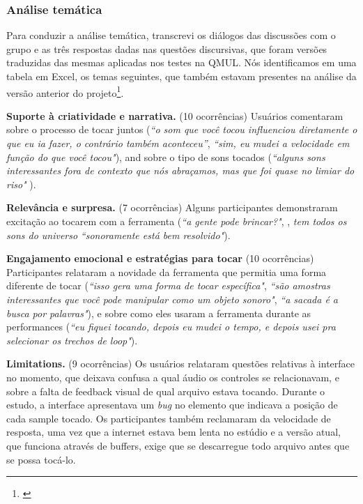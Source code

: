 \subsubsection{Análise temática}
Para conduzir a análise temática\cite{Braun2006}, transcrevi os diálogos das discussões com o grupo e as três respostas dadas nas questões discursivas, que foram versões traduzidas das mesmas aplicadas nos testes na QMUL. Nós identificamos em uma tabela em Excel, os temas seguintes, que também estavam presentes na análise da versão anterior do projeto\footnote{\cite{Stolfi2018b}}.


\textbf{Suporte à criatividade e narrativa.} (10 ocorrências) Usuários comentaram sobre o processo de tocar juntos (\textit{``o som que você tocou influenciou diretamente o que eu ia fazer, o contrário também aconteceu''}, \textit{``sim, eu mudei a velocidade em função do que você tocou"}), and sobre o tipo de sons tocados (\textit{``alguns sons interessantes fora de contexto que nós abraçamos, mas que foi quase no limiar do riso"} ). 

\textbf{Relevância e surpresa.} (7 ocorrências) Alguns participantes demonstraram excitação ao tocarem com a ferramenta (\textit{``a gente pode brincar?"}, , \textit{tem todos os sons do universo} \textit{``sonoramente está bem resolvido"}).

\textbf{Engajamento emocional e estratégias para tocar} (10 ocorrências) Participantes relataram a novidade da ferramenta que permitia uma forma diferente de tocar (\textit{``isso gera uma forma de tocar específica"}, \textit{``são amostras interessantes que você pode manipular como um objeto sonoro"}, \textit{``a sacada é a busca por palavras"}), e sobre como eles usaram a ferramenta durante as performances (\textit{``eu fiquei tocando, depois eu mudei o tempo, e depois usei pra selecionar os trechos de loop"}).

\textbf{Limitations.} (9 ocorrências) Os usuários relataram questões relativas à interface no momento, que deixava confusa a qual áudio os controles se relacionavam, e sobre a falta de feedback visual de qual arquivo estava tocando. Durante o estudo, a interface apresentava um \emph{bug} no elemento que indicava a posição de cada sample tocado. Os participantes também reclamaram da velocidade de resposta, uma vez que a internet estava bem lenta no estúdio e a versão atual, que funciona através de buffers, exige que se descarregue todo arquivo antes que se possa tocá-lo.


